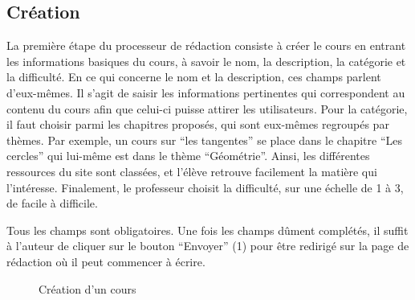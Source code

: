\documentclass[letterpaper,10pt,oneside]{sphinxmanual}
\begin{document}
\subsection{Création}
\label{functionalities:creation}
La première étape du processeur de rédaction consiste à créer le cours en entrant les informations basiques du cours, à savoir le nom, la description, la catégorie et la difficulté. En ce qui concerne le nom et la description, ces champs parlent d'eux-mêmes. Il s'agit de saisir les informations pertinentes qui correspondent au contenu du cours afin que celui-ci puisse attirer les utilisateurs. Pour la catégorie, il faut choisir parmi les chapitres proposés, qui sont eux-mêmes regroupés par thèmes. Par exemple, un cours sur ``les tangentes'' se place dans le chapitre ``Les cercles'' qui lui-même est dans le thème ``Géométrie''. Ainsi, les différentes ressources du site sont classées, et l'élève retrouve facilement la matière qui l'intéresse. Finalement, le professeur choisit la difficulté, sur une échelle de 1 à 3, de facile à difficile.

Tous les champs sont obligatoires. Une fois les champs dûment complétés, il suffit à l'auteur de cliquer sur le bouton ``Envoyer'' (1) pour être redirigé sur la page de rédaction où il peut commencer à écrire.
\begin{figure}[htbp]
\centering
\capstart

\caption{Création d'un cours}\end{figure}
\end{document}
